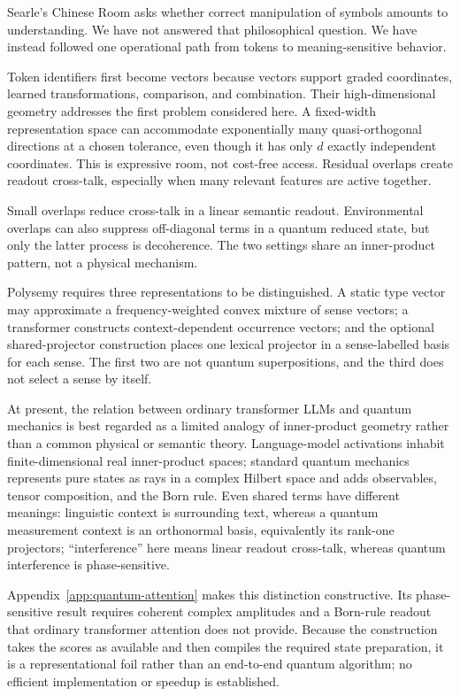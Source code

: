 \documentclass[
  aps,
  reprint,
  superscriptaddress,
  floatfix,
  nofootinbib,
  longbibliography
]{revtex4-2}
\begin{document}
Searle's Chinese Room asks whether correct manipulation of symbols amounts to
understanding.  We have not answered that philosophical question.  We have
instead followed one operational path from tokens to meaning-sensitive
behavior.

Token identifiers first become vectors because vectors support graded
coordinates, learned transformations, comparison, and combination.  Their
high-dimensional geometry addresses the first problem considered here.  A
fixed-width representation space can accommodate exponentially many
quasi-orthogonal
directions at a chosen tolerance, even though it has only $d$ exactly
independent coordinates.  This is expressive room, not cost-free access.
Residual overlaps create readout cross-talk, especially when many relevant
features are active together.

Small overlaps reduce cross-talk in a linear semantic readout.  Environmental
overlaps can also suppress off-diagonal terms in a quantum reduced state, but
only the latter process is decoherence.  The two settings share an
inner-product pattern, not a physical mechanism.

Polysemy requires three representations to be distinguished.  A static type
vector may approximate a frequency-weighted convex mixture of sense vectors;
a transformer constructs context-dependent occurrence vectors; and the
optional shared-projector construction places one lexical projector in a
sense-labelled basis for each sense.  The first two are not quantum
superpositions, and the third does not select a sense by itself.

At present, the relation between ordinary transformer LLMs and quantum mechanics
is best regarded as a limited analogy of inner-product geometry rather than a
common physical or semantic theory.  Language-model activations inhabit
finite-dimensional real inner-product spaces; standard quantum mechanics
represents pure states as rays in a complex Hilbert space and adds observables,
tensor composition, and the Born rule.  Even shared terms have different
meanings: linguistic context is surrounding text, whereas a quantum
measurement context is an orthonormal basis, equivalently its rank-one
projectors; ``interference''
here means linear readout cross-talk, whereas quantum interference is
phase-sensitive.

Appendix~\ref{app:quantum-attention} makes this distinction constructive.  Its
phase-sensitive result requires coherent complex amplitudes and a Born-rule
readout that ordinary transformer attention does not provide.  Because the
construction takes the scores as available and then compiles the required
state preparation, it is a representational foil rather than an end-to-end
quantum algorithm; no efficient implementation or speedup is established.
\end{document}
